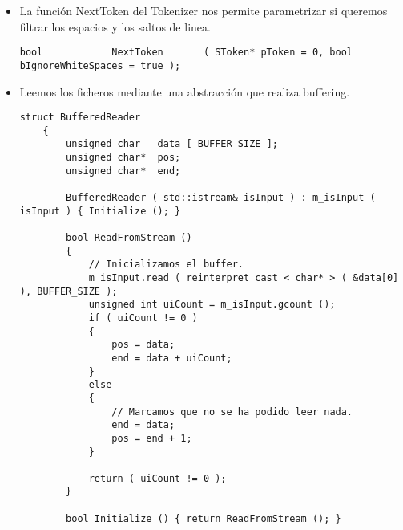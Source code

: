 \begin{itemize}
        \begin{lstlisting}[caption={Trigger para contar lineas en un comentario multilinea}]
void CTokenizer::CheckMultilineComment ( unsigned char c )
{
    static bool bLastCharWasCR = false;

    switch ( c )
    {
        case '\r':
            bLastCharWasCR = true;
            ++m_uiLine;
            m_uiCol = 0;
            break;
        case '\n':
            m_uiCol = 0;
            if ( bLastCharWasCR == true )
            {
                bLastCharWasCR = false;
            }
            else
            {
                ++m_uiLine;
            }
            break;
    }
}
        \end{lstlisting}


    \item La función NextToken del Tokenizer nos permite parametrizar si queremos filtrar los espacios y los saltos de linea.
    
        \begin{lstlisting}[caption={Estructura usada para definir los errores}]
    bool            NextToken       ( SToken* pToken = 0, bool bIgnoreWhiteSpaces = true );
        \end{lstlisting}
    
    \item Leemos los ficheros mediante una abstracción que realiza buffering.
    
        \begin{lstlisting}[caption={BufferedReader}]
        struct BufferedReader
    {
        unsigned char   data [ BUFFER_SIZE ];
        unsigned char*  pos;
        unsigned char*  end;

        BufferedReader ( std::istream& isInput ) : m_isInput ( isInput ) { Initialize (); }

        bool ReadFromStream ()
        {
            // Inicializamos el buffer.
            m_isInput.read ( reinterpret_cast < char* > ( &data[0] ), BUFFER_SIZE );
            unsigned int uiCount = m_isInput.gcount ();
            if ( uiCount != 0 )
            {
                pos = data;
                end = data + uiCount;
            }
            else
            {
                // Marcamos que no se ha podido leer nada.
                end = data;
                pos = end + 1;
            }

            return ( uiCount != 0 );
        }

        bool Initialize () { return ReadFromStream (); }
        

\end{lstlisting}
\end{itemize}
